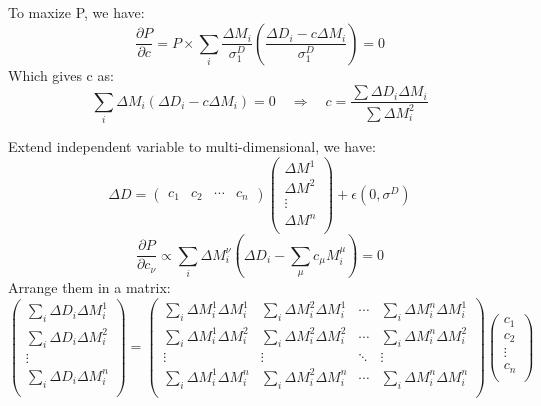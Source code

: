 To maxize P, we have:
\begin{equation}
    \frac{\partial P}{\partial c} = P \times 
    \sum_i \frac{\Delta M_i}{\sigma_1^D} \left( \frac{\Delta D_i - c\Delta M_i}{\sigma_1^D}\right)
    = 0
\end{equation}
Which gives c as:
\begin{equation}
    \sum_i \Delta M_i (\Delta D_i - c\Delta M_i) = 0  \quad \Rightarrow \quad
    c = \frac{\sum \Delta D_i \Delta M_i}{\sum \Delta M^2_i}
\end{equation}

Extend independent variable to multi-dimensional, we have:
\begin{equation}
    \Delta D = \begin{pmatrix} c_1 & c_2 & \cdots & c_n \end{pmatrix} 
	\begin{pmatrix}
	    \Delta M^1	\\
	    \Delta M^2	\\
	    \vdots 	\\
	    \Delta M^n	\\
	\end{pmatrix}
	+ \epsilon(0, \sigma^D)
\end{equation}
\begin{equation}
    \frac{\partial P}{\partial c_\nu} \propto \sum_i \Delta M_i^\nu (\Delta D_i - \sum_\mu c_\mu M_i^\mu) = 0
\end{equation}
Arrange them in a matrix:
\begin{equation}
    \begin{pmatrix}
	\sum_i \Delta D_i \Delta M_i^1 \\
	\sum_i \Delta D_i \Delta M_i^2 \\
	\vdots	\\
	\sum_i \Delta D_i \Delta M_i^n \\
    \end{pmatrix}
    = 
    \begin{pmatrix}
	\sum_i \Delta M_i^1 \Delta M_i^1    & \sum_i \Delta M_i^2 \Delta M_i^1	&
	\cdots	& \sum_i \Delta M_i^n \Delta M_i^1  \\
	\sum_i \Delta M_i^1 \Delta M_i^2    & \sum_i \Delta M_i^2 \Delta M_i^2	&
	\cdots	& \sum_i \Delta M_i^n \Delta M_i^2  \\
	\vdots	& \vdots    & \ddots	& \vdots    \\
	\sum_i \Delta M_i^1 \Delta M_i^n    & \sum_i \Delta M_i^2 \Delta M_i^n	&
	\cdots	& \sum_i \Delta M_i^n \Delta M_i^n  \\
    \end{pmatrix}
    \begin{pmatrix}
	c_1 \\
	c_2 \\
	\vdots	\\
	c_n \\ 
    \end{pmatrix}
\end{equation}

